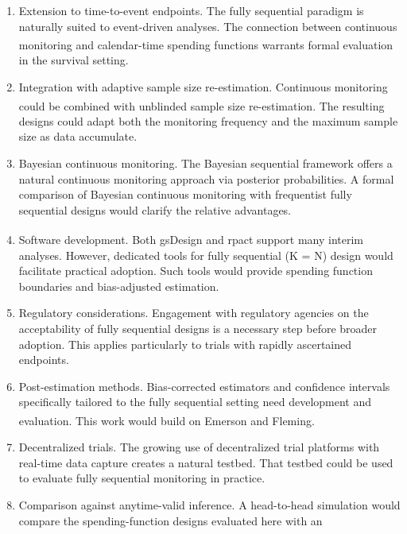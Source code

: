 \documentclass[
  11pt,
]{article}
\begin{document}
\begin{enumerate}
\def\labelenumi{\arabic{enumi}.}
\item
  Extension to time-to-event endpoints. The fully
  sequential paradigm is naturally suited to
  event-driven analyses. The connection between
  continuous monitoring and calendar-time spending
  functions\textsuperscript{} warrants
  formal evaluation in the survival setting.
\item
  Integration with adaptive sample size
  re-estimation. Continuous monitoring could be
  combined with unblinded sample size re-estimation\textsuperscript{}. The resulting designs could
  adapt both the monitoring frequency and the
  maximum sample size as data accumulate.
\item
  Bayesian continuous monitoring. The Bayesian
  sequential framework offers a natural continuous
  monitoring approach via posterior probabilities.
  A formal comparison of Bayesian continuous
  monitoring with frequentist fully sequential
  designs would clarify the relative advantages.
\item
  Software development. Both gsDesign\textsuperscript{} and rpact\textsuperscript{} support many interim analyses.
  However, dedicated tools for fully sequential
  (K = N) design would facilitate practical adoption.
  Such tools would provide spending function
  boundaries and bias-adjusted estimation.
\item
  Regulatory considerations. Engagement with
  regulatory agencies on the acceptability of fully
  sequential designs is a necessary step before
  broader adoption. This applies particularly to
  trials with rapidly ascertained endpoints.
\item
  Post-estimation methods. Bias-corrected estimators
  and confidence intervals specifically tailored to
  the fully sequential setting need development and
  evaluation. This work would build on Emerson and
  Fleming\textsuperscript{}.
\item
  Decentralized trials. The growing use of
  decentralized trial platforms with real-time data
  capture creates a natural testbed. That testbed
  could be used to evaluate fully sequential
  monitoring in practice.
\item
  Comparison against anytime-valid inference. A
  head-to-head simulation would compare the
  spending-function designs evaluated here with an

\end{enumerate}
\end{document}
